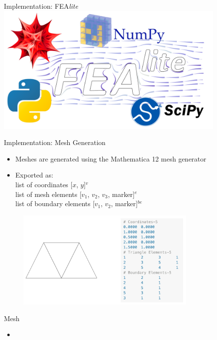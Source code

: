\documentclass{beamer}
\begin{document}
    \begin{frame}{Implementation: FEA\textit{lite}}
        \hspace{-0.72cm}
        \includegraphics[width=4.5in]{technology.pdf}

    \end{frame}

    \begin{frame}{Implementation: Mesh Generation}
        \begin{itemize}
            \item Meshes are generated using the Mathematica 12 mesh generator
            \item Exported as:\\ list of coordinates [$x$, $y$]$^v$ \\list of mesh elements [$v_1$, $v_2$, $v_3$, marker]$^{e}$ \\list of boundary elements [$v_1$, $v_2$, marker]$^{be}$
        \end{itemize}


        \begin{figure}
            \centering
            \includegraphics[width=3.5in]{meshdemo.png}
        \end{figure}

    \end{frame}
    \begin{frame}{Mesh}
        \begin{itemize}
            \item
        \end{itemize}
    \end{frame}
\end{document}
